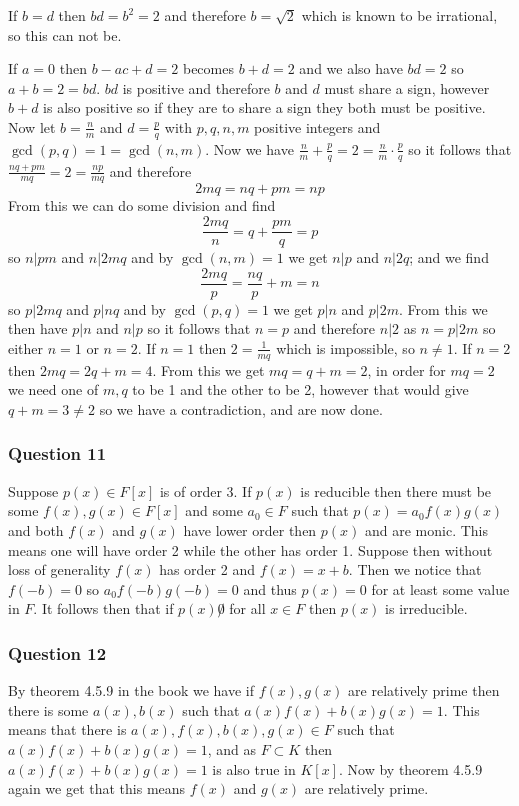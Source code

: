 \documentclass{article}
\begin{document}
If $b=d$ then $bd=b^2=2$ and therefore $b=\sqrt 2$ which is known to be irrational, so this can not be.

If $a=0$ then $b-ac+d=2$ becomes $b+d=2$ and we also have $bd=2$ so $a+b=2=bd$. $bd$ is positive and therefore $b$ and $d$ must share a sign, however $b+d$ is also positive so if they are to share a sign they both must be positive. Now let $b = \frac nm$ and $d=\frac pq$ with $p,q,n,m$ positive integers and $\gcd(p,q) = 1 = \gcd(n,m)$. Now we have $\frac nm + \frac pq = 2=\frac nm\cdot\frac pq$ so it follows that $\frac{nq+pm}{mq}=2=\frac{np}{mq}$ and therefore $$2mq=nq+pm=np$$ From this we can do some division and find $$\frac{2mq}n = q+\frac{pm}q=p$$ so $n|pm$ and $n|2mq$ and by $\gcd(n,m)=1$ we get $n|p$ and $n|2q$; and we find $$\frac{2mq}p=\frac{nq}p+m=n$$ so $p|2mq$ and $p|nq$ and by $\gcd(p,q) = 1$ we get $p|n$ and $p|2m$. From this we then have $p|n$ and $n|p$ so it follows that $n=p$ and therefore $n|2$ as $n=p|2m$ so either $n=1$ or $n=2$. If $n=1$ then $2=\frac{1}{mq}$ which is impossible, so $n\not=1$. If $n=2$ then $2mq = 2q+m=4$. From this we get $mq=q+m=2$, in order for $mq = 2$ we need one of $m,q$ to be 1 and the other to be 2, however that would give $q+m=3\not=2$ so we have a contradiction, and are now done.

\subsubsection{Question 11}
Suppose $p(x)\in F[x]$ is of order 3. If $p(x)$ is reducible then there must be some $f(x),g(x)\in F[x]$ and some $a_0\in F$ such that $p(x)=a_0f(x)g(x)$ and both $f(x)$ and $g(x)$ have lower order then $p(x)$ and are monic. This means one will have order 2 while the other has order 1. Suppose then without loss of generality $f(x)$ has order 2 and $f(x) = x+b$. Then we notice that $f(-b) = 0$ so $a_0f(-b)g(-b) = 0$ and thus $p(x)=0$ for at least some value in $F$. It follows then that if $p(x)\not0$ for all $x\in F$ then $p(x)$ is irreducible.



\subsubsection{Question 12}

By theorem 4.5.9 in the book we have if $f(x),g(x)$ are relatively prime then there is some $a(x),b(x)$ such that $a(x)f(x)+b(x)g(x) = 1$. This means that there is $a(x),f(x),b(x),g(x) \in F$ such that $a(x)f(x)+b(x)g(x) =1$, and as $F\subset K$ then $a(x)f(x)+b(x)g(x) = 1$ is also true in $K[x]$. Now by theorem 4.5.9 again we get that this means $f(x)$ and $g(x)$ are relatively prime.
\end{document}
